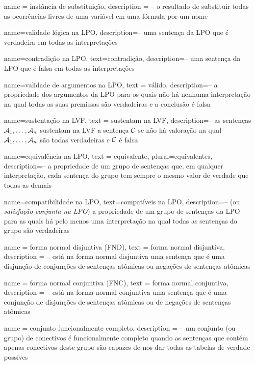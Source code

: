 {
 name = instância de substituição,
 description = {-- o resultado de substituir todas as ocorrências livres de uma variável em uma fórmula por um nome}
}

{
 name=validade lógica na LPO,
 description={-- uma sentença da LPO que é verdadeira em todas as interpretações}
}

{
 name=contradição na LPO,
 text=contradição,
 description={--  uma sentença da LPO que é falsa em todas as interpretações}
} 

{
 name=validade de argumentos na LPO,
 text = válido,
 description={-- a propriedade dos argumentos da LPO para os quais não há nenhuma interpretação na qual todas as suas premissas são verdadeiras e a conclusão é falsa}
}

{
 name=sustentação na LVF,
 text = sustentam na LVF,
 description={-- as sentenças $\mathcal{A}_1, \ldots, \mathcal{A}_n$ sustentam na LVF a sentença $\mathcal{C}$ se não há valoração na qual $\mathcal{A}_1, \ldots, \mathcal{A}_n$ são todas verdadeiras e $\mathcal{C}$ é falsa}
}

{
 name=equivalência na LPO,
 text = equivalente,
 plural=equivalentes,
 description={-- a propriedade de um grupo de sentenças que, em qualquer interpretação, cada sentença do grupo tem sempre o mesmo valor de verdade que todas as demais}
}

{
 name=compatibilidade na LPO,
 text=compatíveis na LPO,
 description={-- (ou \textit{satisfação conjunta na LPO}) a propriedade de um grupo de sentenças da LPO para as quais há pelo menos uma interpretação na qual todas as sentenças do grupo são verdadeiras}
}

{
 name = forma normal disjuntiva (FND),
 text = forma normal disjuntiva,
 description = {-- está na forma normal disjuntiva uma sentença que é uma disjunção de conjunções de sentenças atômicas ou negações de sentenças atômicas}
}

{
 name = forma normal conjuntiva (FNC),
 text = forma normal conjuntiva,
 description = {-- está na forma normal conjuntiva uma sentença que é uma conjunção de disjunções de sentenças atômicas ou de negações de sentenças atômicas}
}

{
 name = conjunto funcionalmente completo,
 description = {-- um conjunto (ou grupo) de conectivos é funcionalmente completo quando as sentenças que contém apenas conectivos deste grupo são capazes de nos dar todas as tabelas de verdade possíves}
}

